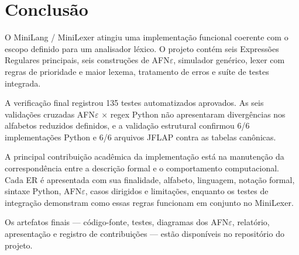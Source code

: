 \chapter{Conclusão}

O MiniLang / MiniLexer atingiu uma implementação funcional coerente com o escopo definido para um analisador léxico. O projeto contém seis Expressões Regulares principais, seis construções de AFN$\varepsilon$, simulador genérico, lexer com regras de prioridade e maior lexema, tratamento de erros e suíte de testes integrada.

A verificação final registrou 135 testes automatizados aprovados. As seis validações cruzadas AFN$\varepsilon$ $\times$ regex Python não apresentaram divergências nos alfabetos reduzidos definidos, e a validação estrutural confirmou 6/6 implementações Python e 6/6 arquivos JFLAP contra as tabelas canônicas.

A principal contribuição acadêmica da implementação está na manutenção da correspondência entre a descrição formal e o comportamento computacional. Cada ER é apresentada com sua finalidade, alfabeto, linguagem, notação formal, sintaxe Python, AFN$\varepsilon$, casos dirigidos e limitações, enquanto os testes de integração demonstram como essas regras funcionam em conjunto no MiniLexer.

Os artefatos finais --- código-fonte, testes, diagramas dos AFN$\varepsilon$, relatório, apresentação e registro de contribuições --- estão disponíveis no repositório do projeto.

